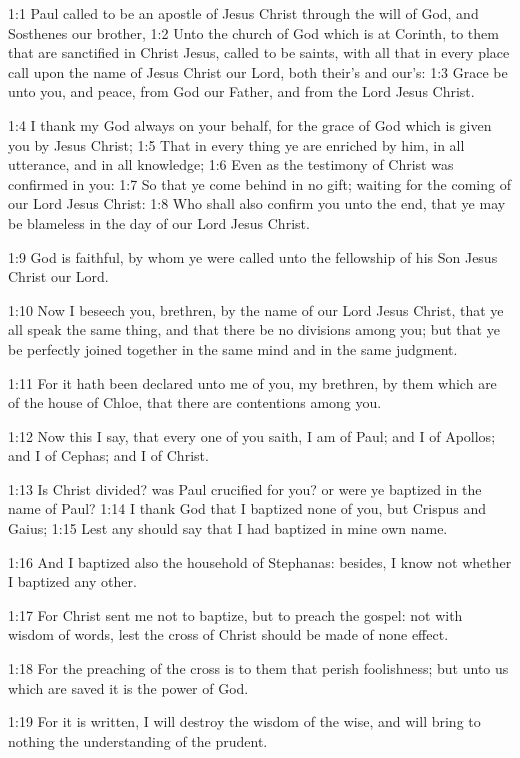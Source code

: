 

1:1 Paul called to be an apostle of Jesus Christ through the will of
God, and Sosthenes our brother, 1:2 Unto the church of God which is at
Corinth, to them that are sanctified in Christ Jesus, called to be
saints, with all that in every place call upon the name of Jesus
Christ our Lord, both their's and our's: 1:3 Grace be unto you, and
peace, from God our Father, and from the Lord Jesus Christ.

1:4 I thank my God always on your behalf, for the grace of God which
is given you by Jesus Christ; 1:5 That in every thing ye are enriched
by him, in all utterance, and in all knowledge; 1:6 Even as the
testimony of Christ was confirmed in you: 1:7 So that ye come behind
in no gift; waiting for the coming of our Lord Jesus Christ: 1:8 Who
shall also confirm you unto the end, that ye may be blameless in the
day of our Lord Jesus Christ.

1:9 God is faithful, by whom ye were called unto the fellowship of his
Son Jesus Christ our Lord.

1:10 Now I beseech you, brethren, by the name of our Lord Jesus
Christ, that ye all speak the same thing, and that there be no
divisions among you; but that ye be perfectly joined together in the
same mind and in the same judgment.

1:11 For it hath been declared unto me of you, my brethren, by them
which are of the house of Chloe, that there are contentions among you.

1:12 Now this I say, that every one of you saith, I am of Paul; and I
of Apollos; and I of Cephas; and I of Christ.

1:13 Is Christ divided? was Paul crucified for you? or were ye
baptized in the name of Paul?  1:14 I thank God that I baptized none
of you, but Crispus and Gaius; 1:15 Lest any should say that I had
baptized in mine own name.

1:16 And I baptized also the household of Stephanas: besides, I know
not whether I baptized any other.

1:17 For Christ sent me not to baptize, but to preach the gospel: not
with wisdom of words, lest the cross of Christ should be made of none
effect.

1:18 For the preaching of the cross is to them that perish
foolishness; but unto us which are saved it is the power of God.

1:19 For it is written, I will destroy the wisdom of the wise, and
will bring to nothing the understanding of the prudent.


